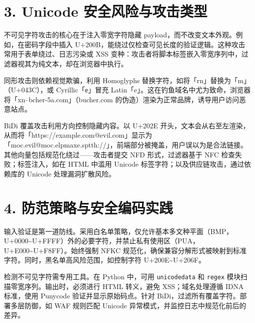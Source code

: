 \chapter{3. Unicode 安全风险与攻击类型}
不可见字符攻击的核心在于注入零宽字符隐藏 payload，而不改变文本外观。例如，在密码字段中插入 U+200B，能绕过仅检查可见长度的验证逻辑。这种攻击常用于表单绕过、日志污染或 XSS 变种：攻击者将脚本标签嵌入零宽序列中，过滤器视其为纯文本，却在浏览器中执行。\par
同形攻击则依赖视觉欺骗，利用 Homoglyphs 替换字符，如将「rn」替换为「m」（U+043C），或 Cyrillic「е」冒充 Latin「e」。这在钓鱼域名中尤为致命，浏览器将「xn--bcher-5a.com」（bucher.com 的伪造）渲染为正常品牌，诱导用户访问恶意站点。\par
BiDi 覆盖攻击利用方向控制隐藏内容。以 U+202E 开头，文本会从右至左渲染，从而将「https://example.com@evil.com」显示为「moc.evil@moc.elpmaxe.sptth://」，前端部分被掩盖，用户误以为是合法链接。其他向量包括规范化绕过——攻击者提交 NFD 形式，过滤器基于 NFC 检查失败；标签注入，如在 HTML 中滥用 Unicode 标签字符；以及供应链攻击，通过依赖库的 Unicode 处理漏洞扩散风险。\par
\chapter{4. 防范策略与安全编码实践}
输入验证是第一道防线。采用白名单策略，仅允许基本多文种平面（BMP，U+0000\~{}U+FFFF）外的必要字符，并禁止私有使用区（PUA，U+E000\~{}U+F8FF）。始终强制 NFKC 规范化，确保兼容分解形式被映射到标准字符。同时，黑名单高风险范围，如控制字符 U+200E\~{}U+206F。\par
检测不可见字符需专用工具。在 Python 中，可用 \texttt{unicodedata} 和 \texttt{regex} 模块扫描零宽序列。输出时，必须进行 HTML 转义，避免 XSS；域名处理遵循 IDNA 标准，使用 Punycode 验证并显示原始码点。针对 BiDi，过滤所有覆盖字符。部署多层防御，如 WAF 规则匹配 Unicode 异常模式，并监控日志中规范化前后的差异。\par
